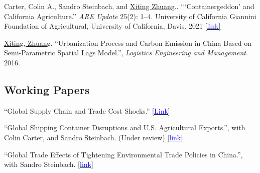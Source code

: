 \documentclass[10.5 pt,letterpaper]{article}
\renewenvironment{itemize}{
	\begin{list}{}{
			\setlength{\leftmargin}{1.5em}
		}
	}{
	\end{list}
}
\begin{document}
\begin{itemize}
 
      \item[-] Carter, Colin A., Sandro Steinbach, and \underline{Xiting Zhuang}.. ```Containergeddon’ and California Agriculture.'' \textit{ARE Update} 25(2): 1–4. University of California Giannini Foundation of Agricultural, University of California, Davis. 2021 \href{https://s.giannini.ucop.edu/uploads/pub/2021/12/20/v25n2_1.pdf}{[{\underline{\textcolor{blue}{link}}}]}
		 	
		 \item[-]	\underline{Xiting, Zhuang}. ``Urbanization Process and Carbon Emission in China Based on Semi-Parametric Spatial Lags Model.'',   \textit{Logistics Engineering and Management}. 2016. 
 

 	
 
		\end{itemize}
	
 
		
		
		
		
	\subsection*{\textbf{Working Papers}}
	
	\begin{itemize}
	

\item[-]	``Global Supply Chain and Trade Cost Shocks.''  
\href{https://xiting-zhuang.github.io/file/jmp.pdf}{[{\underline{\textcolor{blue}{Link}}}]}  




	 \item[-]	``Global Shipping Container Disruptions and U.S. Agricultural Exports.'',  with Colin Carter, and Sandro Steinbach.  (Under review)
	  	\href{http://dx.doi.org/10.22004/ag.econ.320397}{[{\underline{\textcolor{blue}{link}}}]}
	
	
 
 

 
	
 		
	 \item[-] ``Global Trade Effects of Tightening Environmental Trade Policies in China.'', with Sandro Steinbach. 
\href{https://www.dropbox.com/scl/fi/21o4ldsv04zo4w7bs6y5w/Manuscript.pdf?rlkey=phzrh7uhti8zm0wxpn786gu94&dl=0}{[{\underline{\textcolor{blue}{link}}}]}

 

	\end{itemize}
	
\end{document}
